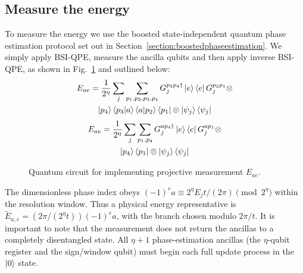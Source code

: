\documentclass[aps,floatfix,10pt,amssymb,amsfont,amsmath,superscriptaddress,float,nofootinbib,longbibliography,nobalancelastpage,twocolumn]{revtex4-2}
\begin{document}
\subsection{Measure the energy}
\label{section:energymeasurement}
To measure the energy we use the boosted state-independent quantum phase estimation protocol set out in Section~\ref{section:boostedphaseestimation}. We simply apply BSI-QPE, measure the ancilla qubits and then apply inverse BSI-QPE, as shown in Fig.~\ref{fig:Ecircuit} and outlined below:
\begin{multline}
    E_{ae} = \frac{1}{2^{\eta}}\sum_j\sum_{p_1,p_2,p_3,p_4} G_j^{p_3p_4 \dagger}\ket{e}\bra{e}G_j^{p_2p_1}\otimes\\\ket{p_4}\braket{p_3|a}\braket{a|p_2}\bra{p_1}\otimes\ket{\psi_j}\bra{\psi_j}
\end{multline}
\begin{multline}
        E_{ae} = \frac{1}{2^{\eta}}\sum_j\sum_{p_1,p_4} G_j^{ap_4 \dagger}\ket{e}\bra{e}G_j^{ap_1}\otimes\\\ket{p_4}\bra{p_1}\otimes\ket{\psi_j}\bra{\psi_j}
\end{multline}
\begin{figure}

\caption{Quantum circuit for implementing projective measurement $E_{ae}$. }
\label{fig:Ecircuit}
\end{figure}
The dimensionless phase index obeys $(-1)^ea\equiv 2^\eta E_jt/(2\pi)\pmod{2^\eta}$ within the resolution window. Thus a physical energy representative is $\widetilde E_{a,e}=(2\pi/(2^\eta t))(-1)^ea$, with the branch chosen modulo $2\pi/t$. It is important to note that the measurement does not return the ancillas to a completely disentangled state. All $\eta+1$ phase-estimation ancillas (the $\eta$-qubit register and the sign/window qubit) must begin each full update process in the $\ket{0}$ state.
\end{document}
